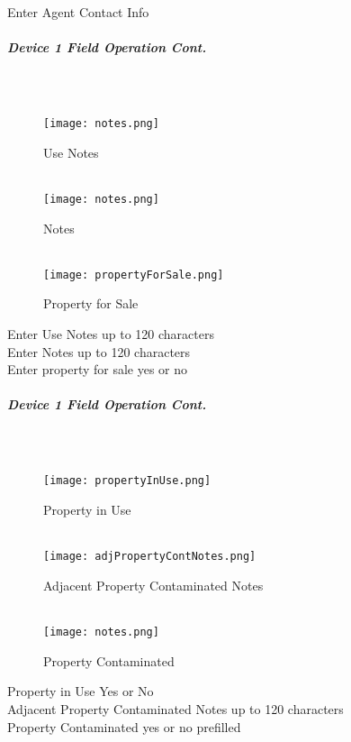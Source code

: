 \documentclass[class=article , crop=false, titlepage, twoside, multi={itemize, figure, verbatim}, float=false]{standalone}
\begin{document}
\noindent Enter Agent Contact Info\\

\clearpage
\subparagraph*{Device 1 Field Operation Cont.}
\subparagraph*{\\}
\begin{wrapfigure}{r}{0.5\textwidth}
\centering
\texttt{[image: notes.png]}
\caption {Use Notes}
\vspace{.2in}
\HRule \\[.4cm] %
\vspace{.2in}
\texttt{[image: notes.png]}
\caption{Notes}
\vspace{.2in}
\HRule \\[.4cm] %
\vspace{.2in}
\texttt{[image: propertyForSale.png]}
\caption{Property for Sale}
\end{wrapfigure}
Enter  Use Notes up to 120 characters\\
\vspace{2in}
\noindent Enter Notes up to 120 characters\\
\vspace{2in}
\noindent Enter property for sale yes or no\\
\clearpage
\subparagraph*{Device 1 Field Operation Cont.}
\subparagraph*{\\}
\begin{wrapfigure}{r}{0.5\textwidth}
\centering
\texttt{[image: propertyInUse.png]}
\caption {Property in Use}
\vspace{.2in}
\HRule \\[.4cm] %
\vspace{.2in}
\texttt{[image: adjPropertyContNotes.png]}
\caption{Adjacent Property Contaminated Notes}
\vspace{.2in}
\HRule \\[.4cm] %
\vspace{.2in}
\texttt{[image: notes.png]}
\caption{Property Contaminated}
\end{wrapfigure}
Property in Use Yes or No\\
\vspace{2in}
\noindent Adjacent Property Contaminated Notes up to 120 characters\\
\vspace{2in}
\noindent Property Contaminated yes or no prefilled\\
\end{document}
